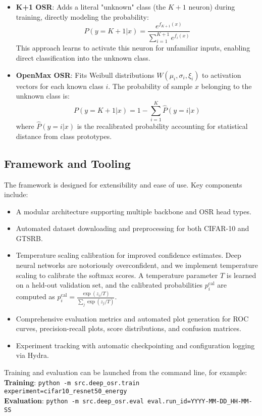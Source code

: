 \documentclass[11pt, a4paper]{article}
\begin{document}
\begin{itemize}
\begin{itemize}
        \item \textbf{K+1 OSR}: Adds a literal "unknown" class (the $K+1$ neuron) during training, directly modeling the probability:
        \begin{equation}
            P(y = K+1 | x) = \frac{e^{f_{K+1}(x)}}{\sum_{i=1}^{K+1} e^{f_i(x)}}
        \end{equation}
        This approach learns to activate this neuron for unfamiliar inputs, enabling direct classification into the unknown class.
        
        \item \textbf{OpenMax OSR}: Fits Weibull distributions $W(\mu_i, \sigma_i, \xi_i)$ to activation vectors for each known class $i$. The probability of sample $x$ belonging to the unknown class is:
        \begin{equation}
            P(y = K+1 | x) = 1 - \sum_{i=1}^{K} \hat{P}(y=i|x)
        \end{equation}
        where $\hat{P}(y=i|x)$ is the recalibrated probability accounting for statistical distance from class prototypes.
    \end{itemize}
\end{itemize}

\subsection{Framework and Tooling}
The framework is designed for extensibility and ease of use. Key components include:
\begin{itemize}
    \item A modular architecture supporting multiple backbone and OSR head types.
    \item Automated dataset downloading and preprocessing for both CIFAR-10 and GTSRB.
    \item Temperature scaling calibration for improved confidence estimates. Deep neural networks are notoriously overconfident, and we implement temperature scaling to calibrate the softmax scores. A temperature parameter $T$ is learned on a held-out validation set, and the calibrated probabilities $p_i^{\text{cal}}$ are computed as $p_i^{\text{cal}} = \frac{\exp(z_i/T)}{\sum_j \exp(z_j/T)}$.
    \item Comprehensive evaluation metrics and automated plot generation for ROC curves, precision-recall plots, score distributions, and confusion matrices.
    \item Experiment tracking with automatic checkpointing and configuration logging via Hydra.
\end{itemize}
Training and evaluation can be launched from the command line, for example: \\
\textbf{Training}: \texttt{python -m src.deep\_osr.train experiment=cifar10\_resnet50\_energy} \\
\textbf{Evaluation}: \texttt{python -m src.deep\_osr.eval eval.run\_id=YYYY-MM-DD\_HH-MM-SS}
\end{document}
